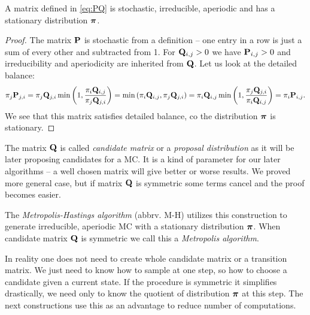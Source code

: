 	\begin{theorem}
		A matrix defined in \ref{eq:PQ} is stochastic, irreducible, aperiodic and has a stationary distribution $\boldsymbol{\pi}$.
	\end{theorem}
	\begin{proof}
		The matrix $\mathbf{P}$ is stochastic from a definition -- one entry in a row is just a sum of every other and subtracted from 1. For $\mathbf{Q}_{i,j} > 0$ we have $\mathbf{P}_{i,j} > 0$ and irreducibility and aperiodicity are inherited from $\mathbf{Q}$. Let us look at the detailed balance:
		\begin{equation*}
			\pi_j \mathbf{P}_{j,i} = \pi_j \mathbf{Q}_{j,i} \min \left(1, \frac{\pi_i \mathbf{Q}_{i,j}}{\pi_j \mathbf{Q}_{j,i}}\right) = \min \left(\pi_i \mathbf{Q}_{i,j}, \pi_j \mathbf{Q}_{j,i} \right) =  \pi_i \mathbf{Q}_{i,j} \min \left(1, \frac{\pi_j \mathbf{Q}_{j,i}}{\pi_i \mathbf{Q}_{i,j}}\right) = \pi_i \mathbf{P}_{i,j}.
		\end{equation*}
		We see that this matrix satisfies detailed balance, co the distribution $\boldsymbol{\pi}$ is stationary.
	\end{proof}
	
	The matrix $\mathbf{Q}$ is called \textit{candidate matrix} or a \textit{proposal distribution} as it will be later proposing candidates for a MC. It is a kind of parameter for our later algorithms -- a well chosen matrix will give better or worse results. We proved more general case, but if matrix $\mathbf{Q}$ is symmetric some terms cancel and the proof becomes easier.
	
	The \textit{Metropolis-Hastings algorithm} (abbrv. M-H) utilizes this construction to generate irreducible, aperiodic MC with a stationary distribution $\boldsymbol{\pi}$. When candidate matrix $\mathbf{Q}$ is symmetric we call this a \textit{Metropolis algorithm}.
	
	
	
	In reality one does not need to create whole candidate matrix or a transition matrix. We just need to know how to sample at one step, so how to choose a candidate given a current state. If the procedure is symmetric it simplifies drastically, we need only to know the quotient of distribution $\boldsymbol{\pi}$ at this step. The next constructions use this as an advantage to reduce number of computations.
	